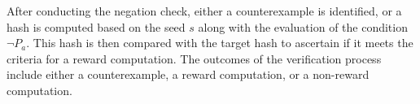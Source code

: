 \documentclass[runningheads]{llncs}
\begin{document}

After conducting the negation check, either a counterexample is identified, or a hash is computed based on the seed $s$ along with the evaluation of the condition $\neg P_{a}$. This hash is then compared with the target hash to ascertain if it meets the criteria for a reward computation. The outcomes of the verification process include either a counterexample, a reward computation, or a non-reward computation.
\end{document}
